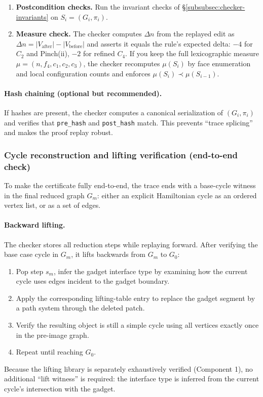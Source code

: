 \documentclass[12pt]{article}
\theoremstyle{definition}
\begin{document}
\begin{enumerate}
\item \textbf{Postcondition checks.}
Run the invariant checks of \S\ref{subsubsec:checker-invariants} on $S_i=(G_i,\pi_i)$.

\item \textbf{Measure check.}
The checker computes $\Delta n$ from the replayed edit as
$\Delta n = |V_{\text{after}}| - |V_{\text{before}}|$
and asserts it equals the rule's expected delta:
$-4$ for $C_2$ and Pinch(ii), $-2$ for refined $C_4$.
If you keep the full lexicographic measure $\mu=(n,f_4,c_1,c_2,c_3)$, the checker recomputes $\mu(S_i)$ by face enumeration
and local configuration counts and enforces $\mu(S_i) \prec \mu(S_{i-1})$.
\end{enumerate}

\paragraph{Hash chaining (optional but recommended).}
If hashes are present, the checker computes a canonical serialization of $(G_i,\pi_i)$ and verifies that
\texttt{pre\_hash} and \texttt{post\_hash} match. This prevents “trace splicing” and makes the proof replay robust.

\subsubsection{Cycle reconstruction and lifting verification (end-to-end check)}
\label{subsubsec:checker-cycle-lifting}

To make the certificate fully end-to-end, the trace ends with a base-cycle witness in the final reduced graph $G_m$:
either an explicit Hamiltonian cycle as an ordered vertex list, or as a set of edges.

\paragraph{Backward lifting.}
The checker stores all reduction steps while replaying forward. After verifying the base case cycle in $G_m$, it lifts
backwards from $G_m$ to $G_0$:
\begin{enumerate}
\item Pop step $s_m$, infer the gadget interface type by examining how the current cycle uses edges incident to the gadget boundary.
\item Apply the corresponding lifting-table entry to replace the gadget segment by a path system through the deleted patch.
\item Verify the resulting object is still a simple cycle using all vertices exactly once in the pre-image graph.
\item Repeat until reaching $G_0$.
\end{enumerate}
Because the lifting library is separately exhaustively verified (Component 1), no additional “lift witness” is required:
the interface type is inferred from the current cycle’s intersection with the gadget.
\end{document}
